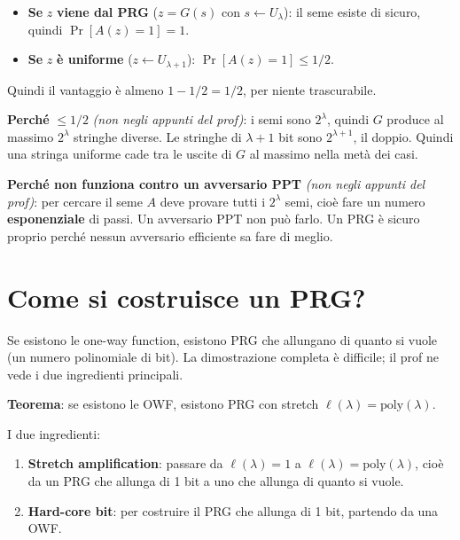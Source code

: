 \begin{itemize}
\tightlist
\item
  \textbf{Se} \(z\) \textbf{viene dal PRG} (\(z = G(s)\) con \(s \leftarrow U_\lambda\)): il seme esiste di sicuro, quindi \(\Pr[A(z) = 1] = 1\).
\item
  \textbf{Se} \(z\) \textbf{è uniforme} (\(z \leftarrow U_{\lambda+1}\)): \(\Pr[A(z) = 1] \le 1/2\).
\end{itemize}

Quindi il vantaggio è almeno \(1 - 1/2 = 1/2\), per niente trascurabile.

\textbf{Perché} \(\le 1/2\) \emph{(non negli appunti del prof)}: i semi sono \(2^\lambda\), quindi \(G\) produce al massimo \(2^\lambda\) stringhe diverse. Le stringhe di \(\lambda + 1\) bit sono \(2^{\lambda+1}\), il doppio. Quindi una stringa uniforme cade tra le uscite di \(G\) al massimo nella metà dei casi.

\textbf{Perché non funziona contro un avversario PPT} \emph{(non negli appunti del prof)}: per cercare il seme \(A\) deve provare tutti i \(2^\lambda\) semi, cioè fare un numero \textbf{esponenziale} di passi. Un avversario PPT non può farlo. Un PRG è sicuro proprio perché nessun avversario efficiente sa fare di meglio.

\section{Come si costruisce un PRG?}

\begin{inbreve}

Se esistono le one-way function, esistono PRG che allungano di quanto si vuole (un numero polinomiale di bit). La dimostrazione completa è difficile; il prof ne vede i due ingredienti principali.

\end{inbreve}

\textbf{Teorema}: se esistono le OWF, esistono PRG con stretch \(\ell(\lambda) = \text{poly}(\lambda)\).

I due ingredienti:

\begin{enumerate}
\def\labelenumi{\arabic{enumi}.}
\tightlist
\item
  \textbf{Stretch amplification}: passare da \(\ell(\lambda) = 1\) a \(\ell(\lambda) = \text{poly}(\lambda)\), cioè da un PRG che allunga di 1 bit a uno che allunga di quanto si vuole.
\item
  \textbf{Hard-core bit}: per costruire il PRG che allunga di 1 bit, partendo da una OWF.
\end{enumerate}

